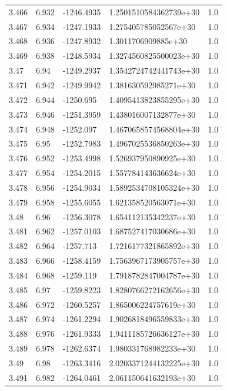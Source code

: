 \begin{tabular}{lllll}
3.466 & 6.932 & -1246.4935 & 1.2501510584362739e+30 & 1.0 \\
3.467 & 6.934 & -1247.1933 & 1.275405785052567e+30 & 1.0 \\
3.468 & 6.936 & -1247.8932 & 1.3011706909885e+30 & 1.0 \\
3.469 & 6.938 & -1248.5934 & 1.3274560825500023e+30 & 1.0 \\
3.47 & 6.94 & -1249.2937 & 1.3542724742441743e+30 & 1.0 \\
3.471 & 6.942 & -1249.9942 & 1.381630592985271e+30 & 1.0 \\
3.472 & 6.944 & -1250.695 & 1.4095413823855295e+30 & 1.0 \\
3.473 & 6.946 & -1251.3959 & 1.438016007132877e+30 & 1.0 \\
3.474 & 6.948 & -1252.097 & 1.4670658574568804e+30 & 1.0 \\
3.475 & 6.95 & -1252.7983 & 1.4967025536850263e+30 & 1.0 \\
3.476 & 6.952 & -1253.4998 & 1.526937950890925e+30 & 1.0 \\
3.477 & 6.954 & -1254.2015 & 1.557784143636624e+30 & 1.0 \\
3.478 & 6.956 & -1254.9034 & 1.5892534708105324e+30 & 1.0 \\
3.479 & 6.958 & -1255.6055 & 1.621358520563071e+30 & 1.0 \\
3.48 & 6.96 & -1256.3078 & 1.654112135342237e+30 & 1.0 \\
3.481 & 6.962 & -1257.0103 & 1.687527417030686e+30 & 1.0 \\
3.482 & 6.964 & -1257.713 & 1.7216177321865892e+30 & 1.0 \\
3.483 & 6.966 & -1258.4159 & 1.7563967173905757e+30 & 1.0 \\
3.484 & 6.968 & -1259.119 & 1.7918782847004787e+30 & 1.0 \\
3.485 & 6.97 & -1259.8223 & 1.8280766272162656e+30 & 1.0 \\
3.486 & 6.972 & -1260.5257 & 1.865006224757619e+30 & 1.0 \\
3.487 & 6.974 & -1261.2294 & 1.9026818496559833e+30 & 1.0 \\
3.488 & 6.976 & -1261.9333 & 1.9411185726636127e+30 & 1.0 \\
3.489 & 6.978 & -1262.6374 & 1.980331768982233e+30 & 1.0 \\
3.49 & 6.98 & -1263.3416 & 2.0203371244132225e+30 & 1.0 \\
3.491 & 6.982 & -1264.0461 & 2.061150641632193e+30 & 1.0 \\

\end{tabular}
